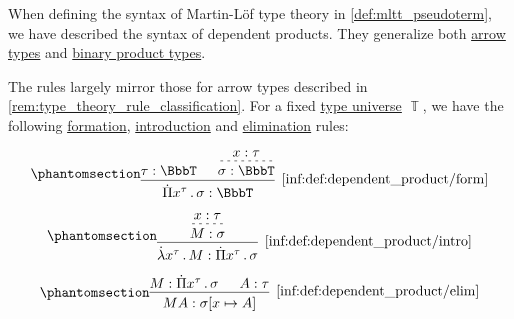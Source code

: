 \begin{definition}\label{def:dependent_product}
  When defining the syntax of Martin-L\"of type theory in \cref{def:mltt_pseudoterm}, we have described the syntax of dependent products. They generalize both \hyperref[def:arrow_type]{arrow types} and \hyperref[def:simple_product_type]{binary product types}.

  The rules largely mirror those for arrow types described in \cref{rem:type_theory_rule_classification}. For a fixed \hyperref[con:type_universe]{type universe} \( \BbbT \), we have the following \hyperref[rem:type_theory_rule_classification/form]{formation}, \hyperref[rem:type_theory_rule_classification/intro]{introduction} and \hyperref[rem:type_theory_rule_classification/elim]{elimination} rules:
  \begin{paracol}{3}
    \begin{nthcolumn}{0}
      \ParacolAlignmentHack
      \begin{equation*}\taglabel[\ensuremath{ \Pi_{\logic{form}} }]{inf:def:dependent_product/form}
        \begin{prooftree}
          \hypo{ \tau: \BbbT }

          \hypo{ x: \tau }
          \infer[dashed]1{ \sigma: \BbbT }

          \infer2[\ref{inf:def:dependent_product/form}]{ \qprod {x^\tau} \sigma: \BbbT }
        \end{prooftree}
      \end{equation*}
    \end{nthcolumn}

    \begin{nthcolumn}{1}
      \ParacolAlignmentHack
      \begin{equation*}\taglabel[\ensuremath{ \Pi_+ }]{inf:def:dependent_product/intro}
        \begin{prooftree}
          \hypo{ x: \tau }
          \infer[dashed]1{ M: \sigma }
          \infer1[\ref{inf:def:dependent_product/intro}]{ \qabs {x^\tau} M: \qprod {x^\tau} \sigma }
        \end{prooftree}
      \end{equation*}
    \end{nthcolumn}

    \begin{nthcolumn}{2}
      \ParacolAlignmentHack
      \begin{equation*}\taglabel[\ensuremath{ \Pi_- }]{inf:def:dependent_product/elim}
        \begin{prooftree}
          \hypo{ M: \qprod {x^\tau} \sigma }
          \hypo{ A: \tau }
          \infer2[\ref{inf:def:dependent_product/elim}]{ M A: \sigma[x \mapsto A] }
        \end{prooftree}
      \end{equation*}
    \end{nthcolumn}
  \end{paracol}


\end{definition}
